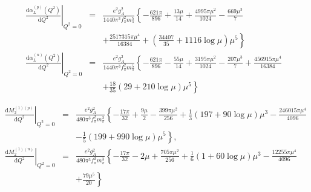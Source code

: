 \documentclass[12pt,preprint,tightenlines,
showpacs,preprintnumbers,amsmath,amssymb,
a4paper,nofootinbib]{revtex4-1}
\def\bea{\begin{eqnarray}}
\def\eea{\end{eqnarray}}
\def\nn{\nonumber}
\def\dd{\mathrm{d}}
\begin{document}
\bea
\left.\frac{\dd\alpha_{L}^{(p)} (Q^2)}{\dd Q^2}\right|_{Q^2=0}&=& \frac{e^2 g_A^2}{1440 \pi^3 f_\pi^2  m_\pi^5}\left\{-\frac{621\pi}{896}+\frac{13\mu}{14}+\frac{4995\pi \mu^2}{1024} - \frac{669\mu^3}{7}\right.\\
&&\left.+\frac{2517315\pi\mu^4}{16384}+ ( \frac{34407}{35} + 1116 \log \mu)\mu^5\right\}\nn\\
\left.\frac{\dd\alpha_{L}^{(n)} (Q^2)}{\dd Q^2}\right|_{Q^2=0}&=&\frac{e^2 g_A^2}{1440 \pi^3 f_\pi^2  m_\pi^5}\left\{-\frac{621\pi}{896}-\frac{55\mu}{14}+\frac{3195\pi\mu^2}{1024}-\frac{207\mu^3}{7}+\frac{456915\pi\mu^4}{16384}\right.\\
&&\left.+\frac{18}{35}(29+210 \log \mu)\mu^5\right\}\nn
\eea

\bea
\left.\frac{\dd M_2^{(1)(p)} }{\dd Q^2}\right|_{Q^2=0}&=&\frac{e^2 g_A^2}{480\pi^3 f_\pi^2 m_\pi^3}\left\{-\frac{17\pi}{32}+\frac{9\mu}{2}-\frac{399\pi\mu^2}{256}+\frac{1}{3}\left(197+90\log \mu\right)\mu^3-\frac{246015\pi\mu^4}{4096}\right.\\
&&\left.-\frac{1}{5}\left(199+990\log \mu\right)\mu^5\right\},\nn\\
\left.\frac{\dd M_2^{(1)(n)} }{\dd Q^2}\right|_{Q^2=0}&=&\frac{e^2 g_A^2}{480\pi^3 f_\pi^2 m_\pi^3}\left\{-\frac{17\pi}{32}-2\mu+\frac{705\pi\mu^2}{256}+\frac{1}{6}\left(1+60\log \mu\right)\mu^3-\frac{12255\pi\mu^4}{4096}\right.\\
&&\left.+\frac{79\mu^5}{20}\right\}\nn
\eea
\end{document}
